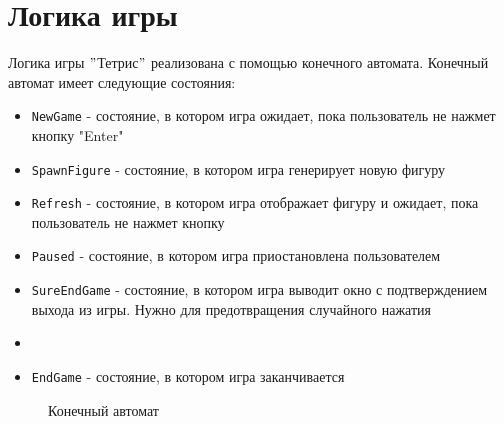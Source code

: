 \documentclass[a4paper,12pt]{article}
\begin{document}
\section{Логика игры}
Логика игры \("\)Тетрис\("\) реализована с помощью конечного автомата. Конечный автомат имеет следующие состояния:
\begin{itemize}
\item \texttt{NewGame} - состояние, в котором игра ожидает, пока пользователь не нажмет кнопку "Enter"
\item \texttt{SpawnFigure} - состояние, в котором игра генерирует новую фигуру
\item \texttt{Refresh} - состояние, в котором игра отображает фигуру и ожидает, пока пользователь не нажмет кнопку
\item \texttt{Paused} - состояние, в котором игра приостановлена пользователем
\item \texttt{SureEndGame} - состояние, в котором игра выводит окно с подтверждением выхода из игры.
Нужно для предотвращения случайного нажатия
\item \item \texttt{EndGame} - состояние, в котором игра заканчивается
\end{itemize}
\begin{figure}[h]
\caption{Конечный автомат}\label{fig:FinitMachine}
\end{figure}
\end{document}
